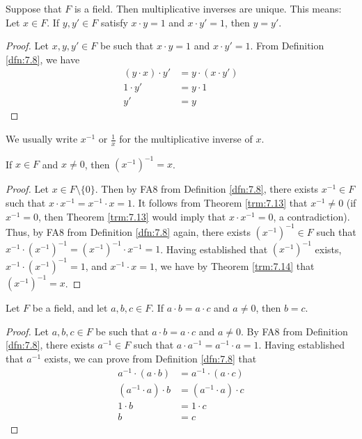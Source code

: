 \documentclass[../main.tex]{subfiles}
\begin{document}
\begin{theorem}\label{trm:7.14}
    Suppose that $F$ is a field. Then multiplicative inverses are unique. This means: Let $x\in F$. If $y,y'\in F$ satisfy $x\cdot y=1$ and $x\cdot y'=1$, then $y=y'$.
    \begin{proof}
        Let $x,y,y'\in F$ be such that $x\cdot y=1$ and $x\cdot y'=1$. From Definition \ref{dfn:7.8}, we have
        \begin{align*}
            (y\cdot x)\cdot y' &= y\cdot (x\cdot y')\tag*{FA6}\\
            1 \cdot y' &= y\cdot 1\tag*{FA8}\\
            y' &= y\tag*{FA7}
        \end{align*}
    \end{proof}
\end{theorem}

We usually write $x^{-1}$ or $\frac{1}{x}$ for the multiplicative inverse of $x$.

\begin{corollary}\label{cly:7.15}
    If $x\in F$ and $x\neq 0$, then $(x^{-1})^{-1}=x$.
    \begin{proof}
        Let $x\in F\setminus\{0\}$. Then by FA8 from Definition \ref{dfn:7.8}, there exists $x^{-1}\in F$ such that $x\cdot x^{-1}=x^{-1}\cdot x=1$. It follows from Theorem \ref{trm:7.13} that $x^{-1}\neq 0$ (if $x^{-1}=0$, then Theorem \ref{trm:7.13} would imply that $x\cdot x^{-1}=0$, a contradiction). Thus, by FA8 from Definition \ref{dfn:7.8} again, there exists $(x^{-1})^{-1}\in F$ such that $x^{-1}\cdot(x^{-1})^{-1}=(x^{-1})^{-1}\cdot x^{-1}=1$. Having established that $(x^{-1})^{-1}$ exists, $x^{-1}\cdot(x^{-1})^{-1}=1$, and $x^{-1}\cdot x=1$, we have by Theorem \ref{trm:7.14} that $(x^{-1})^{-1}=x$.
    \end{proof}
\end{corollary}

\begin{theorem}\label{trm:7.16}
    Let $F$ be a field, and let $a,b,c\in F$. If $a\cdot b=a\cdot c$ and $a\neq 0$, then $b=c$.
    \begin{proof}
        Let $a,b,c\in F$ be such that $a\cdot b=a\cdot c$ and $a\neq 0$. By FA8 from Definition \ref{dfn:7.8}, there exists $a^{-1}\in F$ such that $a\cdot a^{-1}=a^{-1}\cdot a=1$. Having established that $a^{-1}$ exists, we can prove from Definition \ref{dfn:7.8} that
        \begin{align*}
            a^{-1}\cdot(a\cdot b) &= a^{-1}\cdot(a\cdot c)\\
            (a^{-1}\cdot a)\cdot b &= (a^{-1}\cdot a)\cdot c\tag*{FA6}\\
            1\cdot b &= 1\cdot c\tag*{FA8}\\
            b &= c\tag*{FA7}
        \end{align*}
    \end{proof}
\end{theorem}
\end{document}
